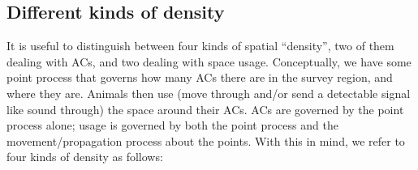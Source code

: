 \documentclass[10pt,a4paper]{article}
\begin{document}


\subsection{Different kinds of density}

It is useful to distinguish between four kinds of spatial ``density'', two of them dealing with ACs, and two dealing with space usage. Conceptually, we have some point process that governs how many ACs there are in the survey region, and where they are. Animals then use (move through and/or send a detectable signal like sound through) the space around their ACs. ACs are governed by the point process alone; usage is governed by both the point process and the movement/propagation process about the points. With this in mind, we refer to four kinds of density as follows:
\end{document}

